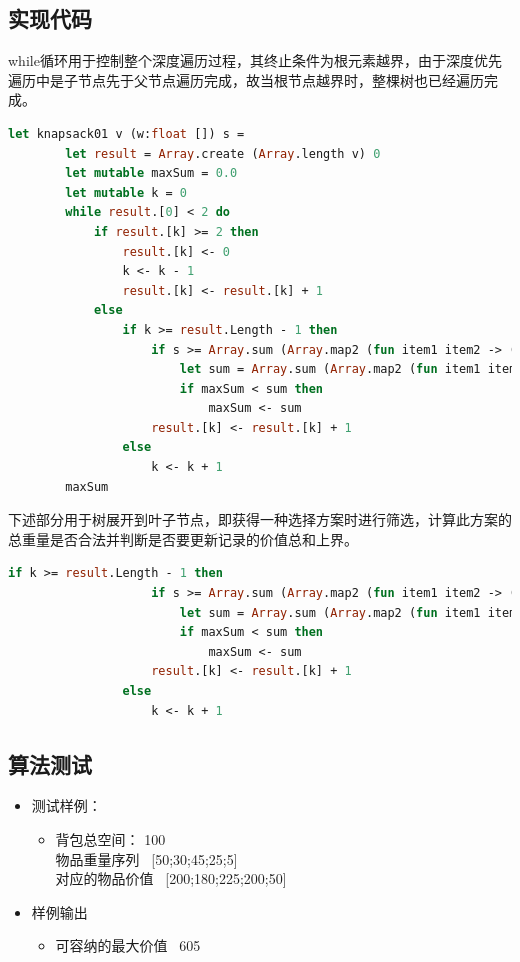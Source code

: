 \documentclass[a4paper]{article}
\begin{document}
\subsection{实现代码}

while循环用于控制整个深度遍历过程，其终止条件为根元素越界，由于深度优先遍历中是子节点先于父节点遍历完成，故当根节点越界时，整棵树也已经遍历完成。

\begin{lstlisting}[language=ML]
    let knapsack01 v (w:float []) s =
        let result = Array.create (Array.length v) 0
        let mutable maxSum = 0.0
        let mutable k = 0
        while result.[0] < 2 do
            if result.[k] >= 2 then
                result.[k] <- 0
                k <- k - 1
                result.[k] <- result.[k] + 1
            else
                if k >= result.Length - 1 then
                    if s >= Array.sum (Array.map2 (fun item1 item2 -> (float item1) * item2 ) result w) then
                        let sum = Array.sum (Array.map2 (fun item1 item2 -> (float item1) * item2 ) result v)
                        if maxSum < sum then
                            maxSum <- sum
                    result.[k] <- result.[k] + 1
                else
                    k <- k + 1
        maxSum
\end{lstlisting}
下述部分用于树展开到叶子节点，即获得一种选择方案时进行筛选，计算此方案的总重量是否合法并判断是否要更新记录的价值总和上界。
\begin{lstlisting}[language=ML]
                if k >= result.Length - 1 then
                    if s >= Array.sum (Array.map2 (fun item1 item2 -> (float item1) * item2 ) result w) then
                        let sum = Array.sum (Array.map2 (fun item1 item2 -> (float item1) * item2 ) result v)
                        if maxSum < sum then
                            maxSum <- sum
                    result.[k] <- result.[k] + 1
                else
                    k <- k + 1
\end{lstlisting}

\subsection{算法测试}

\begin{itemize}
\item
    测试样例：
    \begin{itemize}
    \item
        背包总空间： 100 \\
        物品重量序列 \ [50;30;45;25;5] \\
        对应的物品价值 \ [200;180;225;200;50]
    \end{itemize}
\item
    样例输出
    \begin{itemize}
    \item
        可容纳的最大价值 \ 605
    \end{itemize}
\end{itemize}
\end{document}
